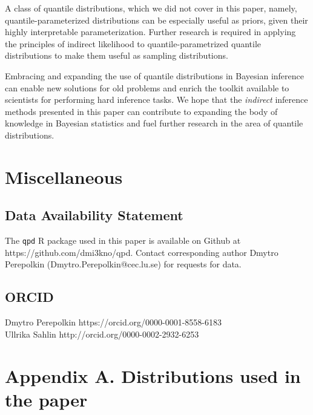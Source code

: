 \documentclass[ba]{imsart}
\numberwithin{equation}{section}
\theoremstyle{plain}
\begin{document}
A class of quantile distributions, which we did not cover in this paper, namely, quantile-parameterized distributions \citep{keelin2011QuantileParameterizedDistributions, hadlock2017JohnsonQuantileParameterizedDistributions, keelin2016MetalogDistributions} can be especially useful as priors, given their highly interpretable parameterization. Further research is required in applying the principles of indirect likelihood to quantile-parametrized quantile distributions to make them useful as sampling distributions.

Embracing and expanding the use of quantile distributions in Bayesian inference can enable new solutions for old problems and enrich the toolkit available to scientists for performing hard inference tasks. We hope that the \emph{indirect} inference methods presented in this paper can contribute to expanding the body of knowledge in Bayesian statistics and fuel further research in the area of quantile distributions.

\hypertarget{miscellaneous}{%
\section*{Miscellaneous}\label{miscellaneous}}

\hypertarget{data-availability-statement}{%
\subsection*{Data Availability Statement}\label{data-availability-statement}}

The \texttt{qpd} R package used in this paper is available on Github at https://github.com/dmi3kno/qpd. Contact corresponding author Dmytro Perepolkin (Dmytro.Perepolkin@cec.lu.se) for requests for data.

\hypertarget{orcid}{%
\subsection*{ORCID}\label{orcid}}

Dmytro Perepolkin https://orcid.org/0000-0001-8558-6183\\
Ullrika Sahlin http://orcid.org/0000-0002-2932-6253

\hypertarget{appendix-a.-distributions-used-in-the-paper}{%
\section*{Appendix A. Distributions used in the paper}\label{appendix-a.-distributions-used-in-the-paper}}
\end{document}
